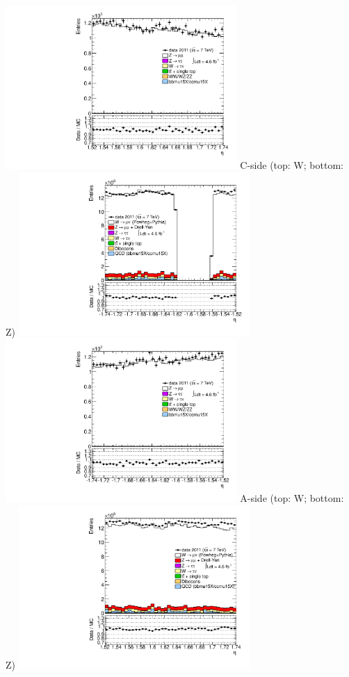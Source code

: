{\includegraphics[width=0.66\textwidth]{dates/20130306/figures/both/Z_8_A_stack_lP_eta_ALL.pdf} 
\cole
}
 {
\colb[T]
C-side (top: W; bottom: Z)
\centering
\includegraphics[width=0.66\textwidth]{dates/20130306/figures/wfix/WFIX_8_C_stack_l_eta_POS} \\
\includegraphics[width=0.66\textwidth]{dates/20130306/figures/both/Z_8_C_stack_lP_eta_ALL.pdf}
A-side (top: W; bottom: Z)
\centering
\includegraphics[width=0.66\textwidth]{dates/20130306/figures/wfix/WFIX_8_A_stack_l_eta_POS} \\
}
